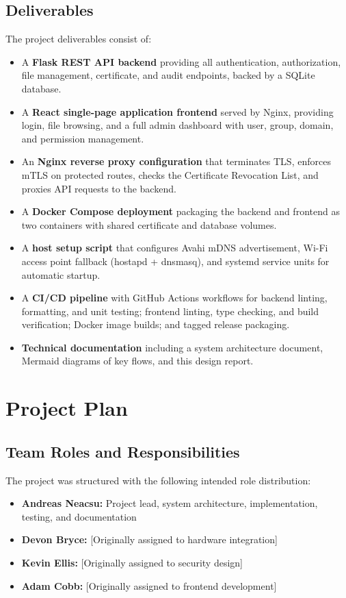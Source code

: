 \documentclass[12pt,letterpaper]{report}
\begin{document}
\section{Deliverables}

The project deliverables consist of:

\begin{itemize}
    \item A \textbf{Flask REST API backend} providing all authentication, authorization, file management, certificate, and audit endpoints, backed by a SQLite database.
    \item A \textbf{React single-page application frontend} served by Nginx, providing login, file browsing, and a full admin dashboard with user, group, domain, and permission management.
    \item An \textbf{Nginx reverse proxy configuration} that terminates TLS, enforces mTLS on protected routes, checks the Certificate Revocation List, and proxies API requests to the backend.
    \item A \textbf{Docker Compose deployment} packaging the backend and frontend as two containers with shared certificate and database volumes.
    \item A \textbf{host setup script} that configures Avahi mDNS advertisement, Wi-Fi access point fallback (hostapd + dnsmasq), and systemd service units for automatic startup.
    \item A \textbf{CI/CD pipeline} with GitHub Actions workflows for backend linting, formatting, and unit testing; frontend linting, type checking, and build verification; Docker image builds; and tagged release packaging.
    \item \textbf{Technical documentation} including a system architecture document, Mermaid diagrams of key flows, and this design report.
\end{itemize}

\chapter{Project Plan}

\section{Team Roles and Responsibilities}

The project was structured with the following intended role distribution:

\begin{itemize}
    \item \textbf{Andreas Neacsu:} Project lead, system architecture, implementation, testing, and documentation
    \item \textbf{Devon Bryce:} [Originally assigned to hardware integration]
    \item \textbf{Kevin Ellis:} [Originally assigned to security design]
    \item \textbf{Adam Cobb:} [Originally assigned to frontend development]
\end{itemize}
\end{document}
